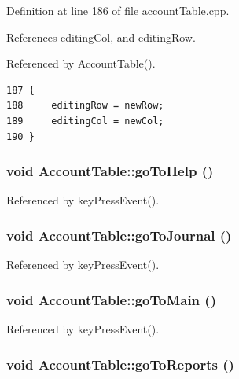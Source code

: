 Definition at line 186 of file account\-Table.cpp.

References editing\-Col, and editing\-Row.

Referenced by Account\-Table().

\footnotesize\begin{verbatim}187 {
188     editingRow = newRow;
189     editingCol = newCol;
190 }
\end{verbatim}\normalsize 


\hypertarget{classAccountTable_l3}{
\subsubsection[goToHelp]{\setlength{\rightskip}{0pt plus 5cm}void Account\-Table::go\-To\-Help ()}}
\label{classAccountTable_l3}




Referenced by key\-Press\-Event().\hypertarget{classAccountTable_l1}{
\subsubsection[goToJournal]{\setlength{\rightskip}{0pt plus 5cm}void Account\-Table::go\-To\-Journal ()}}
\label{classAccountTable_l1}




Referenced by key\-Press\-Event().\hypertarget{classAccountTable_l0}{
\subsubsection[goToMain]{\setlength{\rightskip}{0pt plus 5cm}void Account\-Table::go\-To\-Main ()}}
\label{classAccountTable_l0}




Referenced by key\-Press\-Event().\hypertarget{classAccountTable_l2}{
\subsubsection[goToReports]{\setlength{\rightskip}{0pt plus 5cm}void Account\-Table::go\-To\-Reports ()}}
\label{classAccountTable_l2}




